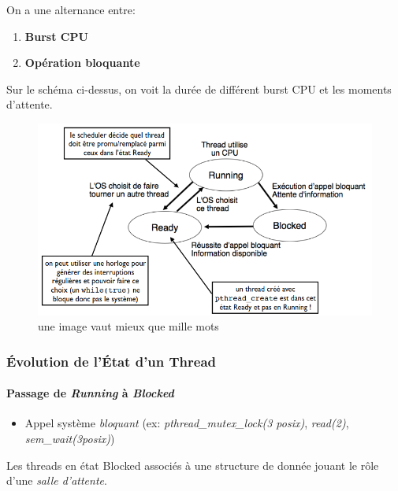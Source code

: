 On a une alternance entre:

\begin{enumerate}
\def\labelenumi{\arabic{enumi}.}
\tightlist
\item
  \textbf{Burst CPU}
\item
  \textbf{Opération bloquante}
\end{enumerate}

Sur le schéma ci-dessus, on voit la durée de différent burst CPU et les
moments d'attente.

\begin{figure}
\centering
\includegraphics{image-29.png}
\caption{une image vaut mieux que mille mots}
\end{figure}

\subsubsection{Évolution de l'État d'un
Thread}\label{uxe9volution-de-luxe9tat-dun-thread}

\paragraph{\texorpdfstring{Passage de \emph{Running} à
\emph{Blocked}}{Passage de Running à Blocked}}\label{passage-de-running-uxe0-blocked}

\begin{itemize}
\tightlist
\item
  Appel système \emph{bloquant} (ex: \emph{pthread\_mutex\_lock(3
  posix)}, \emph{read(2)}, \emph{sem\_wait(3posix)})
\end{itemize}

Les threads en état Blocked associés à une structure de donnée jouant le
rôle d'une \emph{salle d'attente}.

